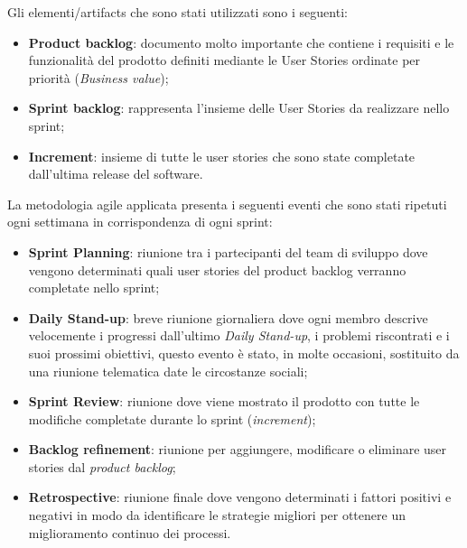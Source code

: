 \noindent
Gli elementi/artifacts che sono stati utilizzati sono i seguenti:
\begin{itemize}
	\item \textbf{Product backlog}: documento molto importante che contiene i requisiti e le funzionalità del prodotto definiti mediante le User Stories ordinate per priorità (\emph{Business value});
	
	\item \textbf{Sprint backlog}: rappresenta l'insieme delle User Stories da realizzare nello sprint;
	
	\item \textbf{Increment}: insieme di tutte le user stories che sono state completate dall'ultima release del software.
\end{itemize}
\noindent
La metodologia agile applicata presenta i seguenti eventi che sono stati ripetuti ogni settimana in corrispondenza di ogni sprint:
\begin{itemize}
	\item \textbf{Sprint Planning}: riunione tra i partecipanti del team di sviluppo dove vengono determinati quali user stories del product backlog verranno completate nello sprint;
	
	\item \textbf{Daily Stand-up}: breve riunione giornaliera dove ogni membro descrive velocemente i progressi dall'ultimo  \emph{Daily Stand-up}, i problemi riscontrati e i suoi prossimi obiettivi, questo evento è stato, in molte occasioni, sostituito da una riunione telematica date le circostanze sociali;
	
	\item \textbf{Sprint Review}: riunione dove viene mostrato il prodotto con tutte le modifiche completate durante lo sprint (\emph{increment});
	
	\item \textbf{Backlog refinement}: riunione per aggiungere, modificare o eliminare user stories dal \emph{product backlog};
	
	\item \textbf{Retrospective}: riunione finale dove vengono determinati i fattori positivi e negativi in modo da identificare le strategie migliori per ottenere un miglioramento continuo dei processi.
\end{itemize}
\noindent

